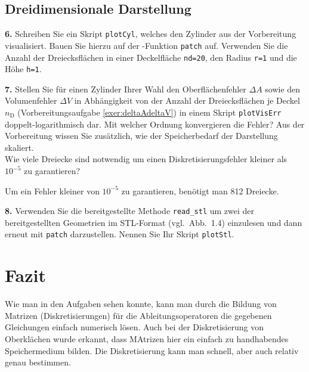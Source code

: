 \documentclass[Protokollheft.tex]{subfiles}
\begin{document}
	
	
	
	{\subsection{Dreidimensionale Darstellung}}
	
	\begin{framed}
		\noindent \textbf{6.} Schreiben Sie ein Skript \lstinline{plotCyl}, welches den Zylinder aus der Vorbereitung visualisiert.
		Bauen Sie hierzu auf der \matlab-Funktion \lstinline{patch} auf. Verwenden Sie die Anzahl der Dreiecksflächen
		in einer Deckelfläche \lstinline{nd=20}, den Radius \lstinline{r=1} und die Höhe \lstinline {h=1}.\label{exer:plotCyl}
	\end{framed}
	
	
	\begin{framed}
		\noindent \textbf{7.} Stellen Sie für einen Zylinder Ihrer Wahl den Oberflächenfehler $\Delta A$ sowie den Volumenfehler $\Delta V$ in Abhängigkeit von der Anzahl der Dreiecksflächen je Deckel $n_\text{D}$ (Vorbereitungsaufgabe \ref{exer:deltaAdeltaV}) in einem Skript
		\lstinline{plotVisErr} doppelt-logarithmisch dar.   Mit welcher Ordnung konvergieren die Fehler?
		Aus der Vorbereitung wissen Sie zusätzlich, wie der Speicherbedarf der
		Darstellung skaliert.\\
		Wie viele Dreiecke sind notwendig um einen Diskretisierungsfehler kleiner als $10^{-5}$ zu garantieren?\label{exer:plotVisErr}
	\end{framed}
	
	Um ein Fehler kleiner von $10^{-5}$ zu garantieren, benötigt man 812 Dreiecke.
	
	\begin{framed}
		\noindent \textbf{8.} Verwenden Sie die bereitgestellte Methode \lstinline{read_stl} um zwei der bereitgestellten Geometrien im STL-Format (vgl.~Abb.~1.4) einzulesen und dann erneut mit \lstinline{patch} darzustellen.
		Nennen Sie Ihr Skript \lstinline{plotStl}.\label{exer:plotStl}
	\end{framed}
	
	
	
	\section{Fazit}
	Wie man in den Aufgaben sehen konnte, kann man durch die Bildung von Matrizen (Diskretisierungen) für die Ableitungsoperatoren die gegebenen Gleichungen einfach numerisch lösen. Auch bei der Diskretisierung von Oberklächen wurde erkannt, dass MAtrizen hier ein einfach zu handhabendes Speichermedium bilden. Die Diskretisierung kann man schnell, aber auch relativ genau bestimmen.
	
\end{document}
